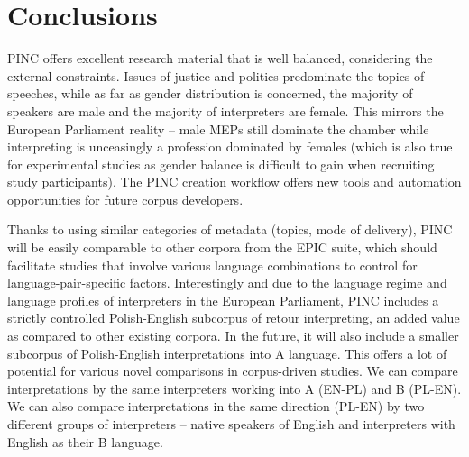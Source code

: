 \documentclass[output=paper]{langscibook}
\begin{document}
\section{Conclusions}
\begin{sloppypar}
PINC offers excellent research material that is well balanced, considering the external constraints. Issues of justice and politics predominate the topics of speeches, while as far as gender distribution is concerned, the majority of speakers are male and the majority of interpreters are female. This mirrors the European Parliament reality – male MEPs still dominate the chamber while interpreting is unceasingly a profession dominated by females (which is also true for experimental studies as gender balance is difficult to gain when recruiting study participants). The PINC creation workflow offers new tools and automation opportunities for future corpus developers. 


Thanks to using similar categories of metadata (topics, mode of delivery), PINC will be easily comparable to other corpora from the EPIC suite, which should facilitate studies that involve various language combinations to control for lan\-guage-pair-specific factors. Interestingly and due to the language regime and language profiles of interpreters in the European Parliament, PINC includes a strictly controlled Polish-English subcorpus of retour interpreting, an added value as compared to other existing corpora. In the future, it will also include a smaller subcorpus of Polish-English interpretations into A language. This offers a lot of potential for various novel comparisons in corpus-driven studies. We can compare interpretations by the same interpreters working into A (EN-PL) and B (PL-EN). We can also compare interpretations in the same direction (PL-EN) by two different groups of interpreters – native speakers of English and interpreters with English as their B language. 
\end{sloppypar}
\end{document}
